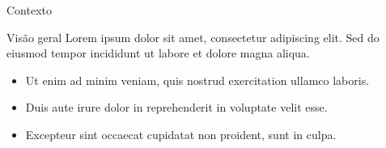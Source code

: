 \begin{frame}{Contexto}
  \begin{block}{Visão geral}
    Lorem ipsum dolor sit amet, consectetur adipiscing elit. Sed do eiusmod
    tempor incididunt ut labore et dolore magna aliqua.
  \end{block}

  \begin{itemize}
    \item Ut enim ad minim veniam, quis nostrud exercitation ullamco laboris.
    \item Duis aute irure dolor in reprehenderit in voluptate velit esse.
    \item Excepteur sint occaecat cupidatat non proident, sunt in culpa.
  \end{itemize}
\end{frame}